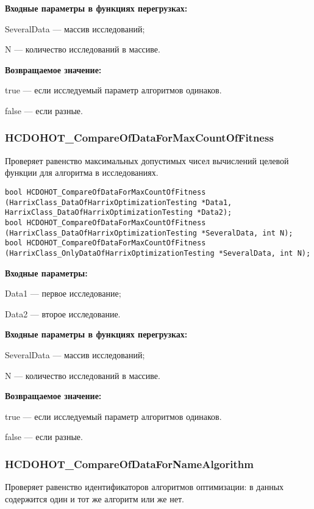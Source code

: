 \documentclass[a4paper,12pt]{article}
\begin{document}
\textbf{Входные параметры в функциях перегрузках:}

SeveralData --- массив исследований;

N --- количество исследований в массиве.

\textbf{Возвращаемое значение:}

true --- если исследуемый параметр алгоритмов одинаков.

false --- если разные.


\subsubsection{HCDOHOT\_CompareOfDataForMaxCountOfFitness}\label{HCDOHOT_CompareOfDataForMaxCountOfFitness}

Проверяет равенство максимальных допустимых чисел вычислений целевой функции для алгоритма в исследованиях.


\begin{lstlisting}[label=code_syntax_HCDOHOT_CompareOfDataForMaxCountOfFitness,caption=Синтаксис]
bool HCDOHOT_CompareOfDataForMaxCountOfFitness (HarrixClass_DataOfHarrixOptimizationTesting *Data1, HarrixClass_DataOfHarrixOptimizationTesting *Data2);
bool HCDOHOT_CompareOfDataForMaxCountOfFitness (HarrixClass_DataOfHarrixOptimizationTesting *SeveralData, int N);
bool HCDOHOT_CompareOfDataForMaxCountOfFitness (HarrixClass_OnlyDataOfHarrixOptimizationTesting *SeveralData, int N);
\end{lstlisting}

\textbf{Входные параметры:}

Data1 --- первое исследование;

Data2 --- второе исследование.

\textbf{Входные параметры в функциях перегрузках:}

SeveralData --- массив исследований;

N --- количество исследований в массиве.

\textbf{Возвращаемое значение:}

true --- если исследуемый параметр алгоритмов одинаков.

false --- если разные.


\subsubsection{HCDOHOT\_CompareOfDataForNameAlgorithm}\label{HCDOHOT_CompareOfDataForNameAlgorithm}

Проверяет равенство идентификаторов алгоритмов оптимизации: в данных содержится один и тот же алгоритм или же нет.
\end{document}
